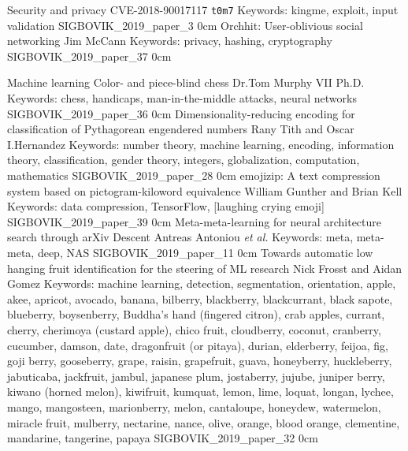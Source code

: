 \addtrack
	{}{Security and privacy}
\addpaper
	{CVE-2018-90017117}
	{\texttt{t0m7}}
	{Keywords: kingme, exploit, input validation}
	{SIGBOVIK_2019_paper_3}
	{0cm}
	{}
\addpaper
	{Orchhit: User-oblivious social networking}
	{Jim McCann}
	{Keywords: privacy, hashing, cryptography}
	{SIGBOVIK_2019_paper_37}
	{0cm}
	{}

\addtrack
	{}{Machine learning}
\addpaper
	{Color- and piece-blind chess}
	{Dr.\@ Tom Murphy VII Ph.D.}
	{Keywords: chess, handicaps, man-in-the-middle attacks, neural networks}
	{SIGBOVIK_2019_paper_36}
	{0cm}
	{}
\addpaper
	{Dimensionality-reducing encoding for classification of Pythagorean engendered numbers}
	{Rany Tith and Oscar I.\@ Hernandez}
	{Keywords: number theory, machine learning, encoding, information theory, classification, gender theory, integers, globalization, computation, mathematics}
	{SIGBOVIK_2019_paper_28}
	{0cm}
	{}
\addpaper
	{emojizip: A text compression system based on pictogram-kiloword equivalence}
	{William Gunther and Brian Kell}
	{Keywords: data compression, TensorFlow, [laughing crying emoji]}
	{SIGBOVIK_2019_paper_39}
	{0cm}
	{}
\addpaper
	{Meta-meta-learning for neural architecture search through arXiv Descent}
	{Antreas Antoniou \textit{et al.}}
	{Keywords: meta, meta-meta, deep, NAS}
	{SIGBOVIK_2019_paper_11}
	{0cm}
	{}
\addpaper
	{Towards automatic low hanging fruit identification for the steering of ML research}
	{Nick Frosst and Aidan Gomez}
	{Keywords: machine learning, detection, segmentation, orientation, apple, akee, apricot, avocado, banana, bilberry, blackberry, blackcurrant, black sapote, blueberry, boysenberry, Buddha's hand (fingered citron), crab apples, currant, cherry, cherimoya (custard apple), chico fruit, cloudberry, coconut, cranberry, cucumber, damson, date, dragonfruit (or pitaya), durian, elderberry, feijoa, fig, goji berry, gooseberry, grape, raisin, grapefruit, guava, honeyberry, huckleberry, jabuticaba, jackfruit, jambul, japanese plum, jostaberry, jujube, juniper berry, kiwano (horned melon), kiwifruit, kumquat, lemon, lime, loquat, longan, lychee, mango, mangosteen, marionberry, melon, cantaloupe, honeydew, watermelon, miracle fruit, mulberry, nectarine, nance, olive, orange, blood orange, clementine, mandarine, tangerine, papaya}
	{SIGBOVIK_2019_paper_32}
	{0cm}
	{}

